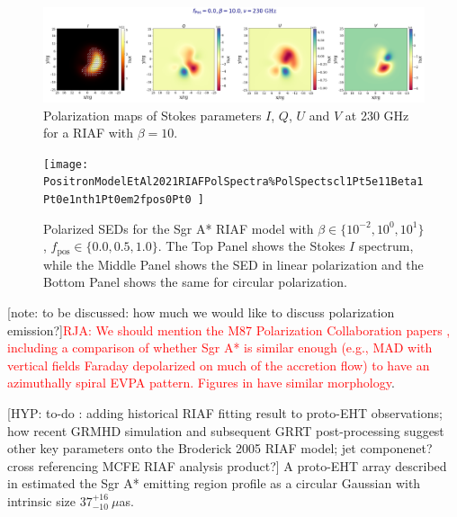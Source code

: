 \documentclass[twocolumn,tighten,dvipsnames,linenumbers]{aastex63}
\newcommand\note[1]{{\color{OliveGreen}[note: #1]}}
\newcommand\hyp[1]{{\color{Salmon}[HYP: #1]}}
\begin{document}
\begin{figure}%
\includegraphics[width=.5\textwidth,height=27mm%
]{RIAFSgrAPlaneTscl1Pt5e11beta1Pt0e01fpos0Pt0fNTH1Pt0e-02copy}
  \caption{Polarization maps of Stokes parameters $I$, $Q$, $U$ and $V$ at 230 GHz for a \cite{Broderick2005} RIAF with $\beta=10$.}
  \label{fig:EmamiRIAF}
\end{figure}

\begin{figure}%
  \texttt{[image: PositronModelEtAl2021RIAFPolSpectra\%PolSpectscl1Pt5e11Beta1Pt0e1nth1Pt0em2fpos0Pt0
]}
  \caption{Polarized SEDs for the Sgr A* RIAF model with  $\beta\in\{10^{-2},10^{0},10^{1}\}$, $f_\mathrm{pos}\in\{0.0,0.5,1.0\}$. The Top Panel shows the Stokes $I$ spectrum, while the Middle Panel shows the SED in linear polarization and the Bottom Panel shows the same for circular polarization.}
  \label{fig:EmamiRIAFSpectra}
\end{figure}


\note{to be discussed: how much we would like to discuss polarization emission?}\textcolor{red}{RJA: We should mention the M87 Polarization Collaboration papers \cite{EHTCPaperVII}, including a comparison of whether Sgr A* is similar enough (e.g., MAD with vertical fields Faraday depolarized on much of the accretion flow) to have an azimuthally spiral EVPA pattern. Figures in  \citep{Emami2021} have similar morphology}.

\hyp{to-do :  adding historical RIAF fitting result to proto-EHT observations; how recent  GRMHD simulation and subsequent GRRT post-processing suggest other key parameters onto the Broderick 2005 RIAF model; jet componenet? cross referencing MCFE RIAF analysis product?} A proto-EHT array described in \cite{Doeleman2008} estimated the Sgr A* emitting region profile as a circular Gaussian with intrinsic size $37^{+16}_{-10}\ \mu$as.
\end{document}

